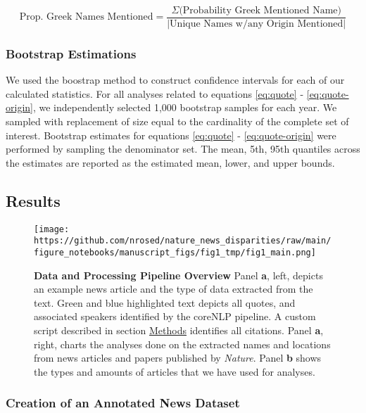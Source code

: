 \begin{equation}\textrm{Prop. Greek Names Mentioned} = \frac{\Sigma \textrm{(Probability Greek Mentioned Name)}} {| \textrm{Unique Names w/any Origin Mentioned}|}\label{eq:quote-origin}\end{equation}

\hypertarget{bootstrap-estimations}{%
\subsubsection{Bootstrap Estimations}\label{bootstrap-estimations}}

We used the boostrap method to construct confidence intervals for each of our calculated statistics.
For all analyses related to equations \ref{eq:quote} - \ref{eq:quote-origin}, we independently selected 1,000 bootstrap samples for each year.
We sampled with replacement of size equal to the cardinality of the complete set of interest.
Bootstrap estimates for equations \ref{eq:quote} - \ref{eq:quote-origin} were performed by sampling the denominator set.
The mean, 5th, 95th quantiles across the estimates are reported as the estimated mean, lower, and upper bounds.

\hypertarget{results}{%
\subsection{Results}\label{results}}

\begin{figure}
\hypertarget{fig:fig1}{%
\centering
\texttt{[image: https://github.com/nrosed/nature\_news\_disparities/raw/main/figure\_notebooks/manuscript\_figs/fig1\_tmp/fig1\_main.png]}
\caption{\textbf{Data and Processing Pipeline Overview}
Panel \textbf{a}, left, depicts an example news article and the type of data extracted from the text.
Green and blue highlighted text depicts all quotes, and associated speakers identified by the coreNLP pipeline.
A custom script described in section \protect\hyperlink{methods}{Methods} identifies all citations.
Panel \textbf{a}, right, charts the analyses done on the extracted names and locations from news articles and papers published by \emph{Nature}.
Panel \textbf{b} shows the types and amounts of articles that we have used for analyses.}\label{fig:fig1}
}
\end{figure}

\hypertarget{creation-of-an-annotated-news-dataset}{%
\subsubsection{Creation of an Annotated News Dataset}\label{creation-of-an-annotated-news-dataset}}

